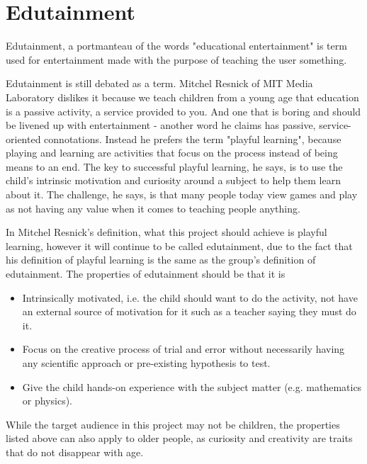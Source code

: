 \section{Edutainment}

Edutainment, a portmanteau of the words "educational entertainment" is term used for entertainment made with the purpose of teaching the user something.

Edutainment is still debated as a term. Mitchel Resnick of MIT Media Laboratory dislikes it because we teach children from a young age that education is a passive activity, a service provided to you. And one that is boring and should be livened up with entertainment - another word he claims has passive, service-oriented connotations. Instead he prefers the term "playful learning", because playing and learning are activities that focus on the process instead of being means to an end. The key to successful playful learning, he says, is to use the child's intrinsic motivation and curiosity around a subject to help them learn about it. The challenge, he says, is that many people today view games and play as not having any value when it comes to teaching people anything. 

In Mitchel Resnick's definition, what this project should achieve is playful learning, however it will continue to be called edutainment, due to the fact that his definition of playful learning is the same as the group's definition of edutainment. The properties of edutainment should be that it is

\begin{itemize}
\item Intrinsically motivated, i.e. the child should want to do the activity, not have an external source of motivation for it such as a teacher saying they must do it.
\item Focus on the creative process of trial and error without necessarily having any scientific approach or pre-existing hypothesis to test.
\item Give the child hands-on experience with the subject matter (e.g. mathematics or physics).
\end{itemize}\cite{edunoty}

While the target audience in this project  may not be children, the properties listed above can also apply to older people, as curiosity and creativity are traits that do not disappear with age.
